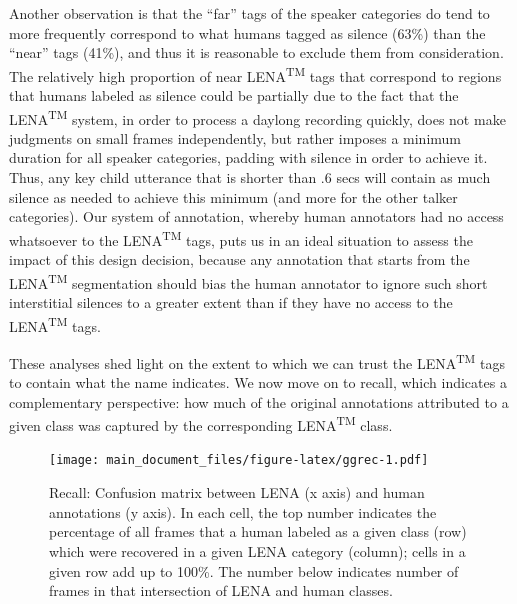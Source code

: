 \documentclass[english,floatsintext,man]{apa6}
\begin{document}
Another observation is that the \enquote{far} tags of the speaker
categories do tend to more frequently correspond to what humans tagged
as silence (63\%) than the \enquote{near} tags (41\%), and thus it is
reasonable to exclude them from consideration. The relatively high
proportion of near LENA\textsuperscript{TM} tags that correspond to
regions that humans labeled as silence could be partially due to the
fact that the LENA\textsuperscript{TM} system, in order to process a
daylong recording quickly, does not make judgments on small frames
independently, but rather imposes a minimum duration for all speaker
categories, padding with silence in order to achieve it. Thus, any key
child utterance that is shorter than .6 secs will contain as much
silence as needed to achieve this minimum (and more for the other talker
categories). Our system of annotation, whereby human annotators had no
access whatsoever to the LENA\textsuperscript{TM} tags, puts us in an
ideal situation to assess the impact of this design decision, because
any annotation that starts from the LENA\textsuperscript{TM}
segmentation should bias the human annotator to ignore such short
interstitial silences to a greater extent than if they have no access to
the LENA\textsuperscript{TM} tags.

These analyses shed light on the extent to which we can trust the
LENA\textsuperscript{TM} tags to contain what the name indicates. We now
move on to recall, which indicates a complementary perspective: how much
of the original annotations attributed to a given class was captured by
the corresponding LENA\textsuperscript{TM} class.

\begin{figure}
\centering
\texttt{[image: main\_document\_files/figure-latex/ggrec-1.pdf]}
\caption{\label{fig:ggrec}Recall: Confusion matrix between LENA (x axis) and
human annotations (y axis). In each cell, the top number indicates the
percentage of all frames that a human labeled as a given class (row)
which were recovered in a given LENA category (column); cells in a given
row add up to 100\%. The number below indicates number of frames in that
intersection of LENA and human classes.}
\end{figure}
\end{document}
